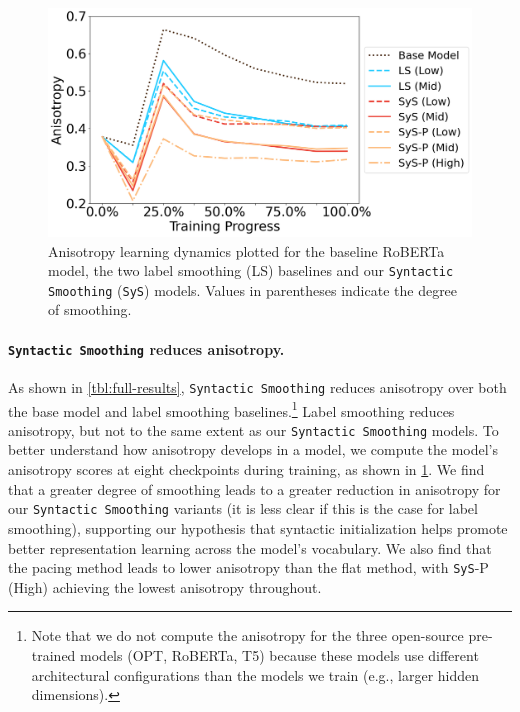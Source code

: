 \begin{figure}[ht!]
    \centering
    \includegraphics[width=0.7\linewidth]{chapters/syntatic-smoothing/figures/anisotropy-learning-dynamics.png}
    \caption{Anisotropy learning dynamics plotted for the baseline RoBERTa model, the two label smoothing (LS) baselines and our \texttt{Syntactic Smoothing} (\texttt{SyS}) models. Values in parentheses indicate the degree of smoothing.}
    \label{fig:anisotropy-learing-dynamics}
    \vspace{-1em}
\end{figure}

\paragraph{\texttt{Syntactic Smoothing} reduces anisotropy.}

As shown in \cref{tbl:full-results}, \texttt{Syntactic Smoothing} reduces anisotropy over both the base model and label smoothing baselines.\footnote{Note that we do not compute the anisotropy for the three open-source pre-trained models (OPT, RoBERTa, T5) because these models use different architectural configurations than the models we train (e.g., larger hidden dimensions).} Label smoothing reduces anisotropy, but not to the same extent as our \texttt{Syntactic Smoothing} models. To better understand how anisotropy develops in a model, we compute the model's anisotropy scores at eight checkpoints during training, as shown in \cref{fig:anisotropy-learing-dynamics}. We find that a greater degree of smoothing leads to a greater reduction in anisotropy for our \texttt{Syntactic Smoothing} variants (it is less clear if this is the case for label smoothing), supporting our hypothesis that syntactic initialization helps promote better representation learning across the model's vocabulary. We also find that the pacing method leads to lower anisotropy than the flat method, with \texttt{SyS}-P (High) achieving the lowest anisotropy throughout.

